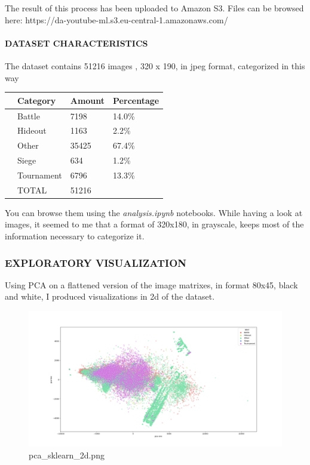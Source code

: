 \documentclass[
]{article}
\begin{document}
The result of this process has been uploaded to Amazon S3. Files can be
browsed here: https://da-youtube-ml.s3.eu-central-1.amazonaws.com/

\hypertarget{dataset-characteristics}{%
\paragraph{DATASET CHARACTERISTICS}\label{dataset-characteristics}}

The dataset contains 51216 images , 320 x 190, in jpeg format,
categorized in this way

\begin{longtable}[]{@{}llll@{}}
\toprule
& Category & Amount & Percentage\tabularnewline
\midrule
\endhead
& Battle & 7198 & 14.0\%\tabularnewline
& Hideout & 1163 & 2.2\%\tabularnewline
& Other & 35425 & 67.4\%\tabularnewline
& Siege & 634 & 1.2\%\tabularnewline
& Tournament & 6796 & 13.3\%\tabularnewline
& TOTAL & 51216 &\tabularnewline
\bottomrule
\end{longtable}

You can browse them using the \emph{analysis.ipynb} notebooks. While
having a look at images, it seemed to me that a format of 320x180, in
grayscale, keeps most of the information necessary to categorize it.

\hypertarget{exploratory-visualization}{%
\subsubsection{EXPLORATORY
VISUALIZATION}\label{exploratory-visualization}}

Using PCA on a flattened version of the image matrixes, in format 80x45,
black and white, I produced visualizations in 2d of the dataset.

\begin{figure}
\centering
\includegraphics{visualizations/pca_sklearn_2d_80_45_L.png}
\caption{pca\_sklearn\_2d.png}
\end{figure}
\end{document}
